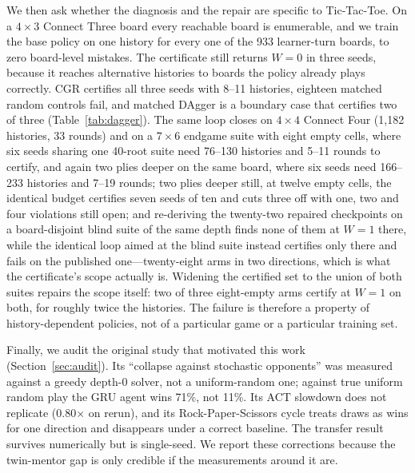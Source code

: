 \documentclass[conference]{IEEEtran}
\begin{document}
We then ask whether the diagnosis and the repair are specific to Tic-Tac-Toe. On a $4\times3$ Connect Three board every reachable board is enumerable, and we train the base policy on one history for every one of the 933 learner-turn boards, to zero board-level mistakes. The certificate still returns $W=0$ in three seeds, because it reaches alternative histories to boards the policy already plays correctly. CGR certifies all three seeds with 8--11 histories, eighteen matched random controls fail, and matched DAgger is a boundary case that certifies two of three (Table~\ref{tab:dagger}). The same loop closes on $4\times4$ Connect Four (1{,}182 histories, 33 rounds) and on a $7\times6$ endgame suite with eight empty cells, where six seeds sharing one 40-root suite need 76--130 histories and 5--11 rounds to certify, and again two plies deeper on the same board, where six seeds need 166--233 histories and 7--19 rounds; two plies deeper still, at twelve empty cells, the identical budget certifies seven seeds of ten and cuts three off with one, two and four violations still open; and re-deriving the twenty-two repaired checkpoints on a board-disjoint blind suite of the same depth finds none of them at $W=1$ there, while the identical loop aimed at the blind suite instead certifies only there and fails on the published one---twenty-eight arms in two directions, which is what the certificate's scope actually is. Widening the certified set to the union of both suites repairs the scope itself: two of three eight-empty arms certify at $W=1$ on both, for roughly twice the histories. The failure is therefore a property of history-dependent policies, not of a particular game or a particular training set.

Finally, we audit the original study that motivated this work (Section~\ref{sec:audit}). Its ``collapse against stochastic opponents'' was measured against a greedy depth-0 solver, not a uniform-random one; against true uniform random play the GRU agent wins 71\%, not 11\%. Its ACT slowdown does not replicate (0.80$\times$ on rerun), and its Rock-Paper-Scissors cycle treats draws as wins for one direction and disappears under a correct baseline. The transfer result survives numerically but is single-seed. We report these corrections because the twin-mentor gap is only credible if the measurements around it are.
\end{document}
